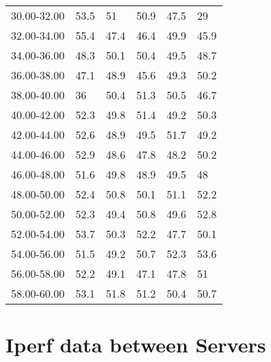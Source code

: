 \begin{sidewaystable}[]
\begin{tabular}{llllll}
		30.00-32.00 & 53.5             & 51               & 50.9             & 47.5             & 29               \\
		32.00-34.00 & 55.4             & 47.4             & 46.4             & 49.9             & 45.9             \\
		34.00-36.00 & 48.3             & 50.1             & 50.4             & 49.5             & 48.7             \\
		36.00-38.00 & 47.1             & 48.9             & 45.6             & 49.3             & 50.2             \\
		38.00-40.00 & 36               & 50.4             & 51.3             & 50.5             & 46.7             \\
		40.00-42.00 & 52.3             & 49.8             & 51.4             & 49.2             & 50.3             \\
		42.00-44.00 & 52.6             & 48.9             & 49.5             & 51.7             & 49.2             \\
		44.00-46.00 & 52.9             & 48.6             & 47.8             & 48.2             & 50.2             \\
		46.00-48.00 & 51.6             & 49.8             & 48.9             & 49.5             & 48               \\
		48.00-50.00 & 52.4             & 50.8             & 50.1             & 51.1             & 52.2             \\
		50.00-52.00 & 52.3             & 49.4             & 50.8             & 49.6             & 52.8             \\
		52.00-54.00 & 53.7             & 50.3             & 52.2             & 47.7             & 50.1             \\
		54.00-56.00 & 51.5             & 49.2             & 50.7             & 52.3             & 53.6             \\
		56.00-58.00 & 52.2             & 49.1             & 47.1             & 47.8             & 51               \\
		58.00-60.00 & 53.1             & 51.8             & 51.2             & 50.4             & 50.7            
	\end{tabular}
\end{sidewaystable}

\section{Iperf data between Servers}\label{sec:iperf_server_server}

